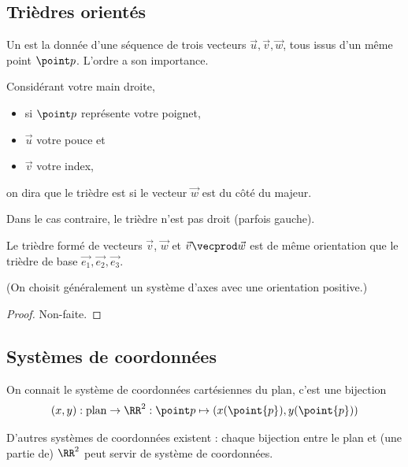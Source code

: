 \subsection{Trièdres orientés}
\begin{frame}
  \begin{definition}
    Un  est la donnée d'une séquence de trois vecteurs \(\vec u, \vec v, \vec w\), tous issus d'un même point \(\point p\). L'ordre a son importance.
  \end{definition}\pause

  \begin{definition}
    Considérant votre main droite,
    \begin{itemize}
    \item si \(\point p\) représente votre poignet,
    \item \(\vec u\) votre pouce et
    \item \(\vec v\) votre index,
    \end{itemize}
    on dira que le trièdre est  si le vecteur \(\vec w\) est du côté du majeur.

    Dans le cas contraire, le trièdre n'est pas droit (parfois \og gauche\fg{}).
  \end{definition}
  
\end{frame}
\begin{frame}
\begin{proposition}
    Le trièdre formé de vecteurs \(\vec v\), \(\vec w\) et \(\vec v \vecprod \vec w\) est de même orientation que le trièdre \og de base\fg{} \(\vec {e_{1}},\vec{e_{2}},\vec{e_{3}}\).
  \end{proposition}
  (On choisit généralement un système d'axes avec une orientation positive.)
  \begin{proof}
    Non-faite.
  \end{proof}
\end{frame}

\subsection{Systèmes de coordonnées}
\begin{frame}
  On connait le système de coordonnées cartésiennes du plan, c'est une bijection
  \begin{equation*}
    (x,y) : \text{plan} \to \RR^2 : \point p \mapsto (x(\point{p}),y(\point{p}))
  \end{equation*}

  D'autres systèmes de coordonnées existent : chaque bijection entre le plan et (une partie de) \(\RR^{2}\) peut servir de système de coordonnées.
\end{frame}

